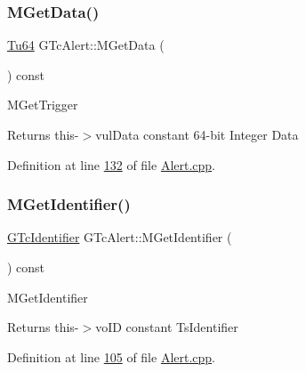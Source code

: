 \subsubsection{\texorpdfstring{M\+Get\+Data()}{MGetData()}}
{\footnotesize\ttfamily \mbox{\hyperlink{namespace_g_n_common_a9404ee6090c788ae70aebd1436ceb97d}{Tu64}} G\+Tc\+Alert\+::\+M\+Get\+Data (\begin{DoxyParamCaption}\item[{void}]{ }\end{DoxyParamCaption}) const}

M\+Get\+Trigger \begin{DoxyReturn}{Returns}
this-\/$>$vul\+Data constant 64-\/bit Integer Data 
\end{DoxyReturn}


Definition at line \mbox{\hyperlink{_alert_8cpp_source_l00132}{132}} of file \mbox{\hyperlink{_alert_8cpp_source}{Alert.\+cpp}}.

\mbox{\label{class_g_n_common_1_1_g_n_notification_1_1_g_tc_alert_a82925f40c7c9a36abea7a339d3329c9e}} 
\subsubsection{\texorpdfstring{M\+Get\+Identifier()}{MGetIdentifier()}}
{\footnotesize\ttfamily \mbox{\hyperlink{class_g_n_common_1_1_g_n_notification_1_1_g_tc_identifier}{G\+Tc\+Identifier}} G\+Tc\+Alert\+::\+M\+Get\+Identifier (\begin{DoxyParamCaption}\item[{void}]{ }\end{DoxyParamCaption}) const}

M\+Get\+Identifier \begin{DoxyReturn}{Returns}
this-\/$>$vo\+ID constant Ts\+Identifier 
\end{DoxyReturn}


Definition at line \mbox{\hyperlink{_alert_8cpp_source_l00105}{105}} of file \mbox{\hyperlink{_alert_8cpp_source}{Alert.\+cpp}}.

\mbox{\label{class_g_n_common_1_1_g_n_notification_1_1_g_tc_alert_a9712a84712c079c649a368302cfaf671}} 
